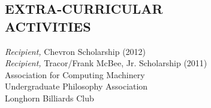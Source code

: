 \documentclass[line,margin]{res}
\begin{document}
\begin{resume}
\section{EXTRA-CURRICULAR \\ ACTIVITIES}            
								{\sl Recipient,} Chevron Scholarship (2012) \\
								{\sl Recipient,} Tracor/Frank McBee, Jr. Scholarship (2011) \\
                Association for Computing Machinery \\
								Undergraduate Philosophy Association \\
								Longhorn Billiards Club

\end{resume}
\end{document}
